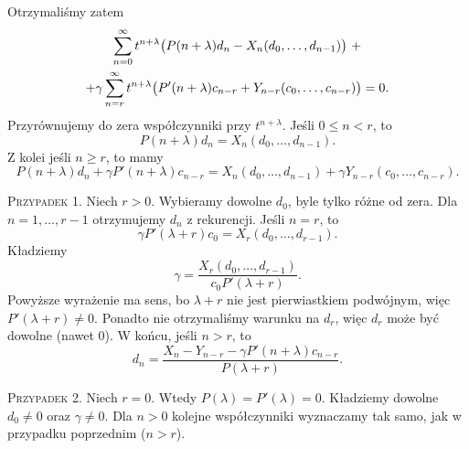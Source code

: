 %
Otrzymaliśmy zatem
%
\begin{multline*}
  \sum_{n=0}^{\infty} t^{n+\lambda} \p[\big]{ P(n+\lambda) d_n - X_n(d_0,\ldots,d_{n-1}) } \ + \\ +
  \gamma \sum_{n=r}^{\infty} t^{n+\lambda} \p[\big]{ P'(n+\lambda) c_{n-r} + Y_{n-r}(c_0,\ldots,c_{n-r}) } = 0.
\end{multline*}
%
Przyrównujemy do zera współczynniki przy $t^{n+\lambda}$. Jeśli $0 \leq n < r$, to
%
\begin{equation*}
  P(n+\lambda) d_n = X_n(d_0,\ldots,d_{n-1}).
\end{equation*}
%
Z kolei jeśli $n \geq r$, to mamy
%
\begin{equation*}
  P(n+\lambda) d_n + \gamma P'(n+\lambda) c_{n-r} = X_n(d_0,\ldots,d_{n-1}) + \gamma Y_{n-r}(c_0,\ldots,c_{n-r}).
\end{equation*}

\textsc{Przypadek 1.} Niech $r>0$. Wybieramy dowolne $d_0$, byle tylko różne od zera. Dla $n=1,\ldots,r-1$ otrzymujemy 
$d_n$ z rekurencji. Jeśli $n=r$, to
%
\begin{equation*}
  \gamma P'(\lambda+r) c_0 = X_r(d_0,\ldots,d_{r-1}).
\end{equation*}
%
Kładziemy
%
\begin{equation*}
  \gamma = \frac{X_r(d_0,\ldots,d_{r-1})}{c_0 P'(\lambda+r)}.
\end{equation*}
%
Powyższe wyrażenie ma sens, bo $\lambda+r$ nie jest pierwiastkiem podwójnym, więc $P'(\lambda+r) \not= 0$. Ponadto nie 
otrzymaliśmy warunku na $d_r$, więc $d_r$ może być dowolne (nawet $0$). W końcu, jeśli $n>r$, to
%
\begin{equation*}
  d_n = \frac{X_n - Y_{n-r} - \gamma P'(n+\lambda) c_{n-r}}{P(\lambda+r)}.
\end{equation*}

\textsc{Przypadek 2.} Niech $r=0$. Wtedy $P(\lambda) = P'(\lambda) = 0$. Kładziemy dowolne $d_0 \not= 0$ oraz $\gamma 
\not= 0$. Dla $n > 0$ kolejne współczynniki wyznaczamy tak samo, jak w przypadku poprzednim ($n>r$).
































